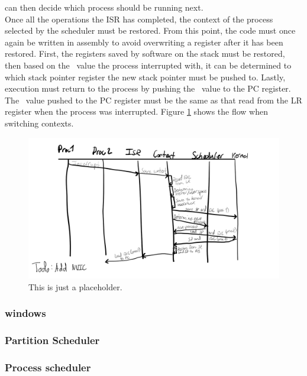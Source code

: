 can then decide which process should be running next.\\
Once all the operations the ISR has completed, the context of the process
selected by the scheduler must be restored. From this point, the code must once
again be written in assembly to avoid overwriting a register after it has been 
restored. First, the registers saved by software on the stack must be restored,
then based on the \excreturn\ value the process interrupted with, it can be 
determined to which stack pointer register the new stack pointer must be pushed
to. Lastly, execution must return to the process by pushing the \excreturn\ value
to the PC register. The \excreturn\ value pushed to the PC register must be the
same as that read from the LR register when the process was interrupted.
Figure \ref{fig:flowchart_contextswitch} shows the flow when switching contexts.
\begin{figure}
    \includegraphics[width=\textwidth]{figures/flowchart_contextswitch.png}
    \caption{This is just a placeholder.}
    \label{fig:flowchart_contextswitch}
\end{figure}

\subsubsection{windows}

\subsubsection{Partition Scheduler}

\subsubsection{Process scheduler}


